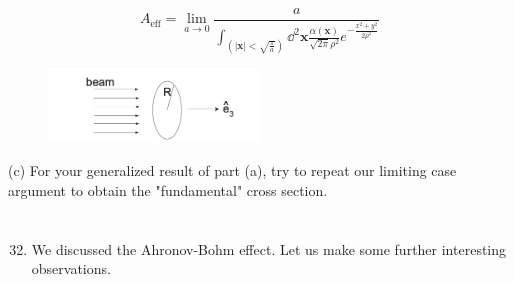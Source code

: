 \documentclass[12pt]{article}
\begin{document}
\begin{equation}
A_{\text{eff}} = \lim_{a \to 0} \frac{a}{\int_{(|\textbf{x}| < \sqrt{\frac{\pi}{a}})} \dd^2{\textbf{x}} \frac{\alpha(\textbf{x})}{{\sqrt{2\pi} \rho^2}} e^{-\frac{x^2 + y^2}{2\rho^2}}}
\end{equation}
\begin{figure}
\centering
\includegraphics[width=0.5\textwidth]{gaussian.png}
\end{figure}

(c) For your generalized result of part (a), try to repeat our limiting case argument to obtain the "fundamental" cross section.
\section{}
\begin{enumerate}
  \setcounter{enumi}{31}
  \item We discussed the Ahronov-Bohm effect. Let us make some further interesting observations.
\end{enumerate}
\end{document}
